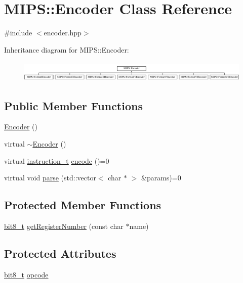 \hypertarget{classMIPS_1_1Encoder}{}\section{M\+I\+PS\+:\+:Encoder Class Reference}
\label{classMIPS_1_1Encoder}


{\ttfamily \#include $<$encoder.\+hpp$>$}

Inheritance diagram for M\+I\+PS\+:\+:Encoder\+:\begin{figure}[H]
\begin{center}
\leavevmode
\includegraphics[height=1.012658cm]{classMIPS_1_1Encoder}
\end{center}
\end{figure}
\subsection*{Public Member Functions}
\begin{DoxyCompactItemize}
\item 
\hyperlink{classMIPS_1_1Encoder_a8c8b884b1cab08714cea0e467a5bea97}{Encoder} ()
\item 
virtual \hyperlink{classMIPS_1_1Encoder_aa19e1b31786eef05c8633790a12fa2a2}{$\sim$\+Encoder} ()
\item 
virtual \hyperlink{core_8hpp_aa514fd240a0e29abb2a2e4c805d7f1a4}{instruction\+\_\+t} \hyperlink{classMIPS_1_1Encoder_ac3ea6ce91eabd41b3c512a39ee4c3550}{encode} ()=0
\item 
virtual void \hyperlink{classMIPS_1_1Encoder_a4a29c42d601460be8e8d353d8fc0da34}{parse} (std\+::vector$<$ char $\ast$ $>$ \&params)=0
\end{DoxyCompactItemize}
\subsection*{Protected Member Functions}
\begin{DoxyCompactItemize}
\item 
\hyperlink{core_8hpp_a6074bae122ae7b527864eec42c728c3c}{bit8\+\_\+t} \hyperlink{classMIPS_1_1Encoder_af0e5dea3612f5063e48257bf0028f2dd}{get\+Register\+Number} (const char $\ast$name)
\end{DoxyCompactItemize}
\subsection*{Protected Attributes}
\begin{DoxyCompactItemize}
\item 
\hyperlink{core_8hpp_a6074bae122ae7b527864eec42c728c3c}{bit8\+\_\+t} \hyperlink{classMIPS_1_1Encoder_a1d07a78c088f8180af5f7b9ec3ca10f0}{opcode}
\end{DoxyCompactItemize}


